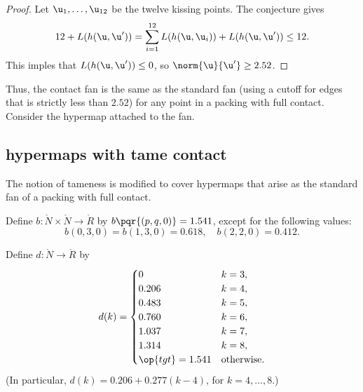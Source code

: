 \begin{proof} Let $ \u_1,\ldots, \u_{12}$ be the twelve kissing
  points.  The conjecture gives
\begin{displaymath}
  12 + L(h( \u, \u')) 
= \sum_{i=1}^{12} L(h( \u, \u_i)) + L(h( \u, \u')) \le 12.
\end{displaymath}
This imples that $L(h( \u, \u'))\le 0$, so $\norm{ \u}{ \u'}\ge 2.52$.
\end{proof}

Thus, the contact fan is the same as the standard fan (using a cutoff
for edges that is strictly less than $2.52$) for any point in a
packing with full contact.  Consider the hypermap attached to the fan.
%
%


\subsection{hypermaps with tame contact}

The notion of tameness is modified to cover hypermaps that arise as
the standard fan of a packing with full contact.
%
%

\begin{definition}[b]
  Define $b:\ring{N}\times \ring{N}\to \ring{R}$ by
  $b\pqr{(p,q,0)}=1.541$, except for the following values:
\begin{displaymath}
b(0,3,0)=b(1,3,0)=0.618,\quad b(2,2,0)=0.412.
\end{displaymath}
\end{definition}
%

\begin{definition}[d]
Define $d:\ring{N}\to \ring{R}$ by
\begin{displaymath}d(k) = \begin{cases}
0 & k=3, \\
0.206 & k=4, \\
0.483 & k=5, \\
0.760 & k=6, \\
1.037 & k=7, \\
1.314 & k=8,\\
\op{tgt}=1.541 & \text{otherwise}.
\end{cases}
\end{displaymath}
(In particular, $d(k) = 0.206 + 0.277 (k-4)$, for $k=4,\ldots,8$.)
\end{definition}
%

